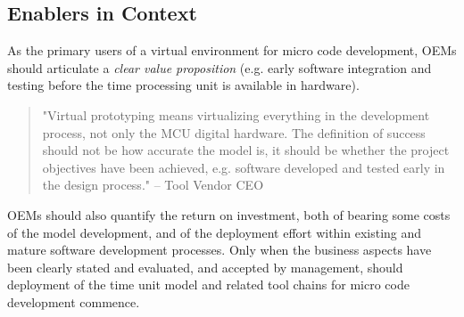 \subsection{Enablers in Context}
As the primary users of a virtual environment for micro code development, OEMs should articulate a \emph{clear value proposition} (e.g. early software integration and testing before the time processing unit is available in hardware).

\begin{quote}
"Virtual prototyping means virtualizing everything in the development process, not only the MCU digital hardware.
The definition of success should not be how accurate the model is, it should be whether the project objectives have been achieved, e.g. software developed and tested early in the design process."
-- Tool Vendor CEO
\end{quote}

OEMs should also quantify the return on investment, both of bearing some costs of the model development, and of the deployment effort within existing and mature software development processes.
Only when the business aspects have been clearly stated and evaluated, and accepted by management, should deployment of the time unit model and related tool chains for micro code development commence.




